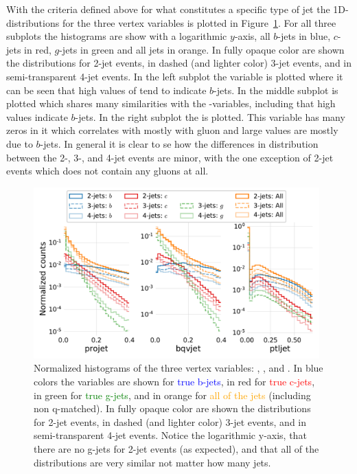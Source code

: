 With the criteria defined above for what constitutes a specific type of jet the 1D-distributions for the three vertex variables is plotted in Figure~\ref{fig:q:vertex_variables}. For all three subplots the histograms are show with a logarithmic $y$-axis, all $b$-jets in blue, $c$-jets in red, $g$-jets in green and all jets in orange. In fully opaque color are shown the distributions for 2-jet events, in dashed (and lighter color) 3-jet events, and in semi-transparent 4-jet events. In the left subplot the  variable is plotted where it can be seen that high values of  tend to indicate $b$-jets. In the middle subplot  is plotted which shares many similarities with the -variables, including that high values indicate $b$-jets. In the right subplot the  is plotted. This variable has many zeros in it which correlates with mostly with gluon and large values are mostly due to $b$-jets. In general it is clear to se how the differences in distribution between the \num{2}-, \num{3}-, and \num{4}-jet events are minor, with the one exception of \num{2}-jet events which does not contain any gluons at all. 

\begin{figure}
  \includegraphics[width=0.98\textwidth, trim=0 0 0 0, clip]{figures/quarks/btagging_variables_hist-down_sample=1.00-ML_vars=vertex-selection=b-ejet_min=4-n_iter_RS_lgb=99-n_iter_RS_xgb=9-cdot_cut=0.90-version=19.pdf}
  \caption[Histograms of the vertex variables]
          {Normalized histograms of the three vertex variables: , , and . In blue colors the variables are shown for \textcolor{blue}{true b-jets}, in red for \textcolor{red}{true c-jets}, in green for \textcolor{green}{true g-jets}, and in orange for \textcolor{orange}{all of the jets} (including non q-matched). In fully opaque color are shown the distributions for 2-jet events, in dashed (and lighter color) 3-jet events, and in semi-transparent 4-jet events. Notice the logarithmic y-axis, that there are no g-jets for 2-jet events (as expected), and that all of the distributions are very similar not matter how many jets.
          } 
  \label{fig:q:vertex_variables}
\end{figure}

